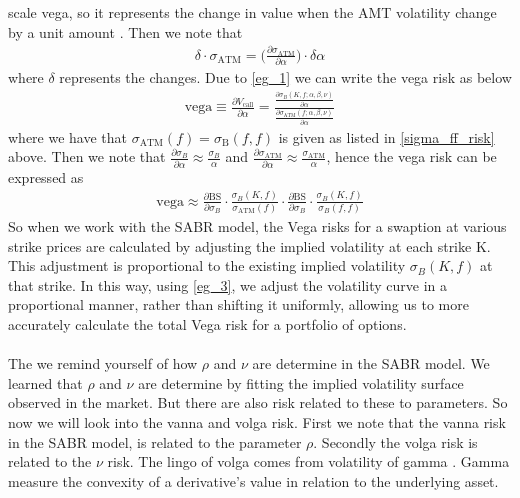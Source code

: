 scale vega, so it represents the change in value when the AMT volatility change by a unit amount \cite{Smile}.
Then we note that 
\begin{align}
    \delta  \cdot \sigma_{\text{ATM}} =
     \Big(\frac{\partial \sigma_{\text{ATM}}}{\partial \alpha} \Big) \cdot \delta \alpha \label{eg_1}
\end{align}
where $\delta$ represents the changes. Due to \autoref{eg_1} we can write the vega risk as below
\begin{align}
    \text{vega} \equiv  \frac{\partial V_{\text{call}}}{\partial \alpha} 
   = \frac{\frac{\partial \sigma_B(K, f; \alpha, \beta, \nu)}{\partial \alpha}}
    {\frac{\partial \sigma_{\text{ATM}}(f; \alpha, \beta, \nu)}{\partial \alpha}} \label{eg_3}
\end{align}
 where we have that $\sigma_{\text{ATM}}(f) = \sigma_{\text{B}} (f,f)$  is given as listed in \autoref{sigma_ff_risk}
 above. 
Then we note that  $\frac{\partial \sigma_B}{\partial \alpha} \approx \frac{ \sigma_B}{ \alpha}$ 
and $\frac{\partial \sigma_{\text{ATM}}}{\partial \alpha} \approx \frac{ \sigma_{\text{ATM}}}{\alpha}$,
hence the vega risk can be expressed as 
\begin{align}
\text{vega} \approx \frac{\partial \text{BS}}{\partial \sigma_B} \cdot
 \frac{\sigma_B(K,f)}{\sigma_{\text{ATM}}(f)} \cdot \frac{\partial \text{BS}}{\partial \sigma_B} 
 \cdot \frac{\sigma_B(K,f)}{\sigma_B(f,f)}
\end{align}
So when we work with the SABR model,
the Vega risks for a swaption at various strike prices are calculated by adjusting the implied volatility at each strike 
K. This adjustment is proportional to the existing implied volatility 
$\sigma_B(K,f)$
at that strike. In this way, using \autoref{eg_3}, we adjust the
volatility curve in a proportional manner, rather than shifting 
it uniformly, allowing us to more accurately calculate the total
Vega risk for a portfolio of options.
\\\\
The we  remind yourself of how $\rho$ and $\nu$ are determine in the SABR model.
We learned that $\rho$ and $\nu$ are determine by fitting the implied volatility
surface observed in the market. But there are also risk related to these 
to parameters. So now we will look into the vanna and volga risk. 
First we note that the vanna risk in the SABR model, is related 
to the  parameter $\rho$. Secondly the volga risk is related
to the $\nu$ risk. The lingo of volga comes from volatility of gamma
\cite{Smile}. Gamma measure the convexity of a derivative's value in relation to the underlying asset. 
